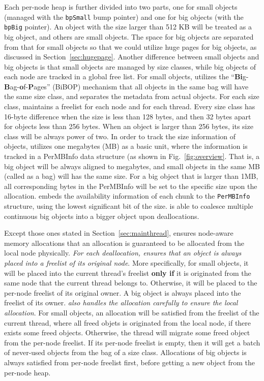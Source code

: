 Each per-node heap is further divided into two parts,  one for small objects (managed with the \texttt{bpSmall} bump pointer) and one for big objects (with the \texttt{bpBig} pointer). An object with the size larger than 512 KB will be treated as a big object, and others are small objects. The space for big objects are separated from that for small objects so that we could utilize huge pages for big objects, as discussed in Section~\ref{sec:hugepage}. Another difference between small objects and big objects is that small objects are managed by size classes, 
while big objects of each node are tracked in a global free list.  For small objects, \NM{} utilizes the ``\textbf{Bi}g-\textbf{B}ag-\textbf{o}f-\textbf{P}ages'' (BiBOP) mechanism that all objects in the same bag will have the same size class, and separates the metadata from actual objects. For each size class, \NM{} maintains a freelist for each node and for each thread. Every 
size class has 16-byte difference when the size is less than 128 bytes, and then 32 bytes apart for objects less than 256 bytes. When an object is larger than 256 bytes, its size class will be always power of two. In order to track the size information of objects, \NM{} utilizes one megabytes (MB) as a basic unit, where the information is tracked in a PerMBInfo data structure (as shown in Fig.~\ref{fig:overview}. That is, a big object will be always aligned to megabytes, and small objects in the same MB (called as a bag) will has the same size. For a big object that is larger than 1MB, all corresponding bytes in the PerMBInfo will be set to the specific size upon the allocation. \NM{} embeds the availability information of each chunk to the \texttt{PerMBInfo} structure, using the lowest significant bit of the size. \NM{} is able to coalesce multiple continuous big objects into a bigger object upon deallocations.  


Except those ones stated in Section~\ref{sec:mainthread}, \NA{} ensures node-aware memory allocations that an allocation is guaranteed to be allocated from the local node physically.
\textit{For each deallocation, \NM{} ensures that an object is always placed into a freelist of its original node}. More specifically, for small objects, it will be  placed into the current thread's freelist \textbf{only if} it is originated from the same node that the current thread belongs to. Otherwise, it will be placed to the per-node freelist of its original owner. A big object is always placed into the freelist of its owner. \textit{\NM{} also handles the allocation carefully to ensure the local allocation}. For small objects, an allocation will be satisfied from the freelist of the current thread, where all freed objets is originated from the local node, if there exists some freed objects. Otherwise, the thread will migrate some freed object from the per-node freelist. If its per-node freelist is empty, then it will get a batch of never-used objects from the bag of a size class. Allocations of big objects is always satisfied from per-node freelist first, before getting a new object from the per-node heap.   


